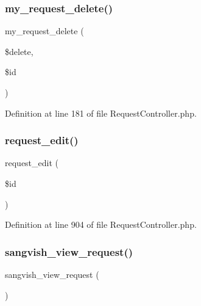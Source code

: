 \subsubsection{\texorpdfstring{my\_request\_delete()}{my\_request\_delete()}}
{\footnotesize\ttfamily my\+\_\+request\+\_\+delete (\begin{DoxyParamCaption}\item[{}]{\$delete,  }\item[{}]{\$id }\end{DoxyParamCaption})}



Definition at line 181 of file Request\+Controller.\+php.

\mbox{\label{class_responsive_1_1_http_1_1_controllers_1_1_request_controller_a181cfc7902be3de4d254b59b6715efe1}} 
\subsubsection{\texorpdfstring{request\_edit()}{request\_edit()}}
{\footnotesize\ttfamily request\+\_\+edit (\begin{DoxyParamCaption}\item[{}]{\$id }\end{DoxyParamCaption})}



Definition at line 904 of file Request\+Controller.\+php.

\mbox{\label{class_responsive_1_1_http_1_1_controllers_1_1_request_controller_a34dc9bf7a254d8cfdc103f150de995c7}} 
\subsubsection{\texorpdfstring{sangvish\_view\_request()}{sangvish\_view\_request()}}
{\footnotesize\ttfamily sangvish\+\_\+view\+\_\+request (\begin{DoxyParamCaption}{ }\end{DoxyParamCaption})}



